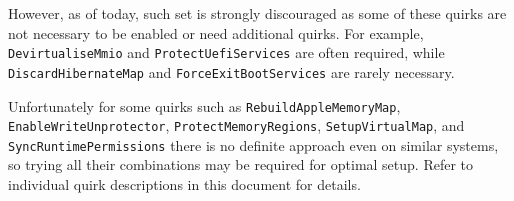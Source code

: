 \documentclass[]{article}
\begin{document}
\begin{enumerate}
  However, as of today, such set is strongly discouraged as some of these quirks
  are not necessary to be enabled or need additional quirks. For example,
  \texttt{DevirtualiseMmio} and \texttt{ProtectUefiServices} are often required,
  while \texttt{DiscardHibernateMap} and \texttt{ForceExitBootServices} are rarely
  necessary.

  Unfortunately for some quirks such as \texttt{RebuildAppleMemoryMap},
  \texttt{EnableWriteUnprotector}, \texttt{ProtectMemoryRegions},
  \texttt{SetupVirtualMap}, and \texttt{SyncRuntimePermissions} there
  is no definite approach even on similar systems, so trying all their
  combinations may be required for optimal setup. Refer to individual quirk
  descriptions in this document for details.

\end{enumerate}
\end{document}

